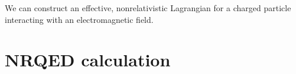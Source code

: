 



We can construct an effective, nonrelativistic Lagrangian for a charged particle interacting with an electromagnetic field.
%
\chapter{NRQED calculation}



